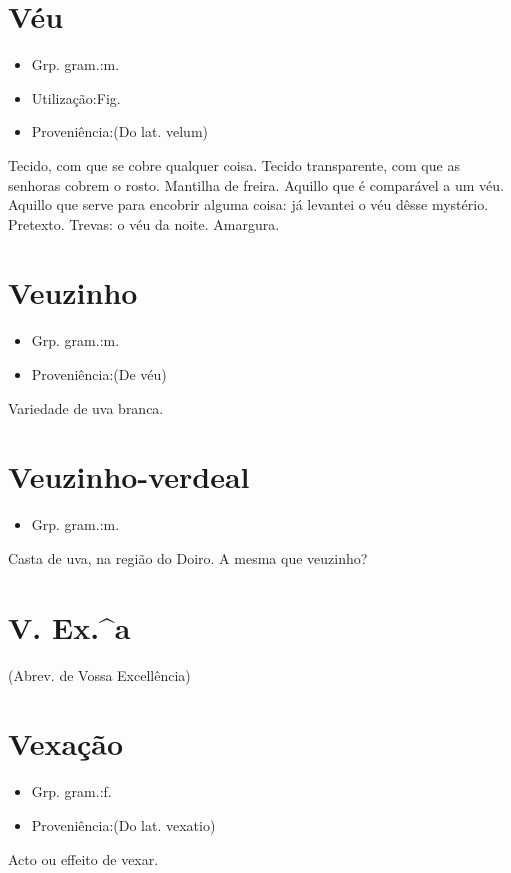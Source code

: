 \documentclass{article}
\begin{document}
\section{Véu}
\begin{itemize}
\item {Grp. gram.:m.}
\end{itemize}
\begin{itemize}
\item {Utilização:Fig.}
\end{itemize}
\begin{itemize}
\item {Proveniência:(Do lat. \textunderscore velum\textunderscore )}
\end{itemize}
Tecido, com que se cobre qualquer coisa.
Tecido transparente, com que as senhoras cobrem o rosto.
Mantilha de freira.
Aquillo que é comparável a um véu.
Aquillo que serve para encobrir alguma coisa: \textunderscore já levantei o véu dêsse mystério\textunderscore .
Pretexto.
Trevas: \textunderscore o véu da noite\textunderscore .
Amargura.
\section{Veuzinho}
\begin{itemize}
\item {Grp. gram.:m.}
\end{itemize}
\begin{itemize}
\item {Proveniência:(De \textunderscore véu\textunderscore )}
\end{itemize}
Variedade de uva branca.
\section{Veuzinho-verdeal}
\begin{itemize}
\item {Grp. gram.:m.}
\end{itemize}
Casta de uva, na região do Doiro.
A mesma que \textunderscore veuzinho\textunderscore ?
\section{V. Ex.^a}
(Abrev. de \textunderscore Vossa Excellência\textunderscore )
\section{Vexação}
\begin{itemize}
\item {Grp. gram.:f.}
\end{itemize}
\begin{itemize}
\item {Proveniência:(Do lat. \textunderscore vexatio\textunderscore )}
\end{itemize}
Acto ou effeito de vexar.
\end{document}
